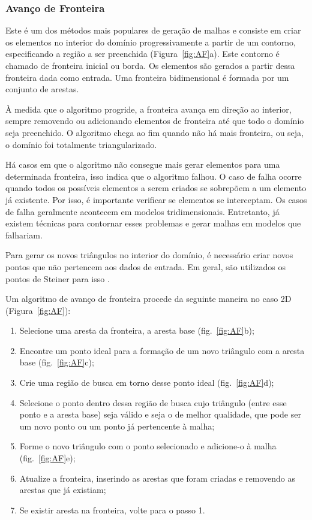 \subsubsection{Avanço de Fronteira}

Este é um dos métodos mais populares de geração de malhas e consiste em criar os elementos no interior do domínio progressivamente a partir de um contorno, especificando a região a ser preenchida (Figura~\ref{fig:AF}a). Este contorno é chamado de fronteira inicial ou borda. Os elementos são gerados a partir dessa fronteira dada como entrada. Uma fronteira bidimensional é formada por um conjunto de arestas.

À medida que o algoritmo progride, a fronteira avança em direção ao interior, sempre removendo ou adicionando elementos de fronteira até que todo o domínio seja preenchido. O algoritmo chega ao fim quando não há mais fronteira, ou seja, o domínio foi totalmente triangularizado. 

Há casos em que o algoritmo não consegue mais gerar elementos para uma determinada fronteira, isso indica que o algoritmo falhou. O caso de falha ocorre quando todos os possíveis elementos a serem criados se sobrepõem a um elemento já existente. Por isso, é importante verificar se elementos se interceptam. Os casos de falha geralmente acontecem em modelos tridimensionais. Entretanto, já existem técnicas para contornar esses problemas e gerar malhas em modelos que falhariam.

Para gerar os novos triângulos no interior do domínio, é necessário criar novos pontos que não pertencem aos dados de entrada. Em geral, são utilizados os pontos de Steiner para isso \cite{bib:Ruppert99}.

Um algoritmo de avanço de fronteira procede da seguinte maneira no caso 2D (Figura~\ref{fig:AF}):
 
 \begin{enumerate}
\item{ Selecione uma aresta da fronteira, a aresta base (fig.~\ref{fig:AF}b);}
\item{ Encontre um ponto ideal para a formação de um novo triângulo com a aresta base (fig.~\ref{fig:AF}c);}
\item{ Crie uma região de busca em torno desse ponto ideal (fig.~\ref{fig:AF}d);}
\item{ Selecione o ponto dentro dessa região de busca cujo triângulo (entre esse ponto e a aresta base) seja válido e seja o de melhor qualidade, que pode ser um novo ponto ou um ponto já pertencente à malha;}
\item{ Forme o novo triângulo com o ponto selecionado e adicione-o à malha (fig.~\ref{fig:AF}e);}
\item{ Atualize a fronteira, inserindo as arestas que foram criadas e removendo as arestas que já existiam;}
\item{ Se existir aresta na fronteira, volte para o passo 1.}
\end{enumerate}

